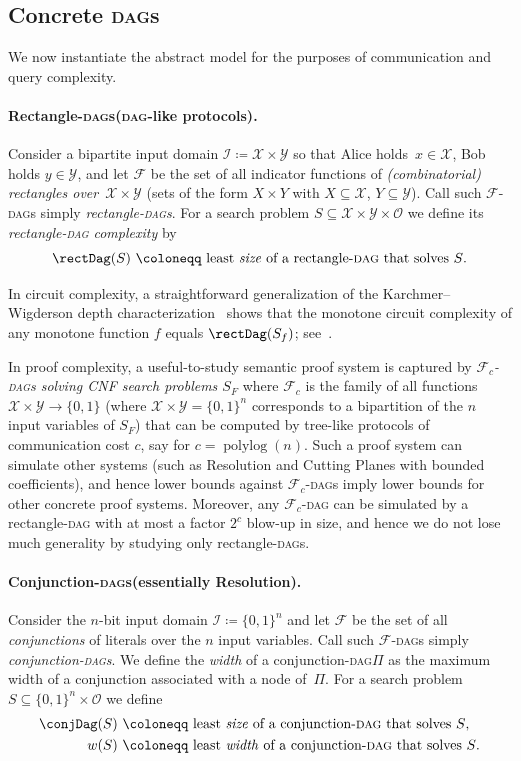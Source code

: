 \documentclass[11pt]{article}
\numberwithin{equation}{section}
\theoremstyle{definition}
\theoremstyle{plain}
\DeclareMathOperator{\polylog}{polylog}
\newcommand{\DAG}{\textsc{dag}}
\newcommand{\DAGs}{\textsc{dag}s\xspace}
\newcommand{\DAGspace}{\textsc{dag}\xspace}
\newcommand{\calI}{\mathcal{I}}
\newcommand{\calO}{\mathcal{O}}
\newcommand{\calF}{\mathcal{F}}
\newcommand{\calX}{\mathcal{X}}
\newcommand{\calY}{\mathcal{Y}}
\begin{document}
\subsection{Concrete \DAGs}

We now instantiate the abstract model for the purposes of communication and query complexity.

\paragraph{Rectangle-\DAGs (\DAG-like protocols).}
Consider a bipartite input domain $\calI\coloneqq \calX\times\calY$ so that Alice holds~$x\in\calX$, Bob holds $y\in\calY$, and let $\calF$ be the set of all indicator functions of \emph{(combinatorial) rectangles over~$\calX\times\calY$} (sets of the form $X\times Y$ with $X\subseteq\calX$, $Y\subseteq\calY$). Call such $\calF$-\DAGs simply \emph{rectangle-\DAGs}. For a search problem $S\subseteq \calX\times\calY\times\calO$ we define its \emph{rectangle-\DAGspace complexity} by
\[
\rectDag(S)~\coloneqq~\text{least \emph{size} of a rectangle-\DAGspace that solves $S$}.
\]

In circuit complexity, a straightforward generalization of the Karchmer--Wigderson depth characterization~\cite{karchmer88monotone} shows that the monotone circuit complexity of any monotone function $f$ equals $\rectDag(S_f)$; see~\cite{pudlak10extracting,sokolov17dag}.

In proof complexity, a useful-to-study semantic proof system is captured by \emph{$\calF_c$-\DAGs solving CNF search problems $S_F$} where $\calF_c$ is the family of all functions $\calX\times\calY\to\{0,1\}$ (where $\calX\times\calY=\{0,1\}^n$ corresponds to a bipartition of the $n$ input variables of $S_F$) that can be computed by tree-like protocols of communication cost $c$, say for $c=\polylog(n)$. Such a proof system can simulate other systems (such as Resolution and Cutting Planes with bounded coefficients), and hence lower bounds against $\calF_c$-\DAGs imply lower bounds for other concrete proof systems. Moreover, any $\calF_c$-\DAGspace can be simulated by a rectangle-\DAGspace with at most a factor $2^c$ blow-up in size, and hence we do not lose much generality by studying only rectangle-\DAGs.

\paragraph{Conjunction-\DAGs (essentially Resolution).}
Consider the $n$-bit input domain $\calI\coloneqq\{0,1\}^n$ and let $\calF$ be the set of all \emph{conjunctions} of literals over the $n$ input variables. Call such $\calF$-\DAGs simply \emph{conjunction-\DAGs}. We define the \emph{width} of a conjunction-\DAGspace $\Pi$ as the maximum width of a conjunction associated with a node of~$\Pi$. For a search problem $S\subseteq \{0,1\}^n\times\calO$ we define
\begin{align*}
\conjDag(S)&~\coloneqq~\text{least \emph{size} of a conjunction-\DAGspace that solves $S$},\\
w(S)&~\coloneqq~\text{least \emph{width} of a conjunction-\DAGspace that solves $S$}.
\end{align*}
\end{document}
